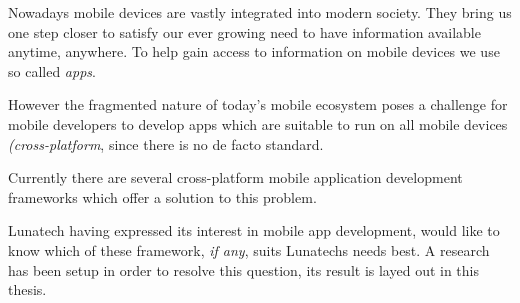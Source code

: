 \samenvatting



Nowadays mobile devices are vastly integrated into modern society. They bring us one step closer to satisfy our ever growing need to have information available anytime, anywhere. To help gain access to information on mobile devices we use so called \emph{apps}. 

However the fragmented nature of today's mobile ecosystem poses a challenge for mobile developers to develop apps which are suitable to run on all mobile devices \emph{(cross-platform}, since there is no de facto standard.

Currently there are several cross-platform mobile application development frameworks which offer a solution to this problem. 

Lunatech having expressed its interest in mobile app development, would like to know which of these framework, \emph{if any}, suits Lunatechs needs best. A research has been setup in order to resolve this question, its result is layed out in this thesis.


